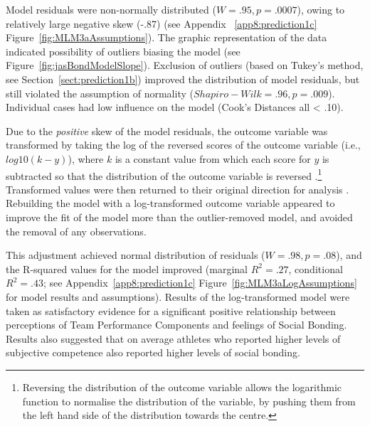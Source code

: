 \begin{CJK}{UTF8}{gbsn}
Model residuals were non-normally distributed ($W = .95, p = .0007$), owing to relatively large negative skew (-.87) (see Appendix ~\ref{app8:prediction1c} Figure~\ref{fig:MLM3aAssumptions}).  The graphic representation of the data indicated possibility of outliers biasing the model (see Figure~\ref{fig:jasBondModelSlope}).
Exclusion of outliers (based on Tukey's method, see Section~\ref{sect:prediction1b}) improved the distribution of model residuals, but still violated the assumption of normality ($Shapiro-Wilk = .96, p = .009$).  Individual cases had low influence on the model (Cook's Distances all < .10).

Due to the \textit{positive} skew of the model residuals, the outcome variable was transformed by taking the log of the reversed scores of the outcome variable (i.e., $log10(k - y)$), where $k$ is a constant value from which each score for $y$ is subtracted so that the distribution of the outcome variable is reversed \citep{Howell2012}.\footnote{Reversing the distribution of the outcome variable allows the logarithmic function to normalise the distribution of the variable, by pushing them from the left hand side of the distribution towards the centre.}
Transformed values were then returned to their original direction for analysis \citep{Field2012}.  Rebuilding the model with a log-transformed outcome variable appeared to improve the fit of the model more than the outlier-removed model, and avoided the removal of any observations.

This adjustment achieved normal distribution of residuals ($W = .98, p = .08$), and the R-squared values for the model improved (marginal $R^2 = .27$, conditional $R^2 = .43$; see Appendix~\ref{app8:prediction1c} Figure~\ref{fig:MLM3aLogAssumptions} for model results and assumptions).  Results of the log-transformed model were taken as satisfactory evidence for a significant positive relationship between perceptions of Team Performance Components and feelings of Social Bonding.  Results also suggested that on average athletes who reported higher levels of subjective competence also reported higher levels of social bonding.



\end{CJK}
